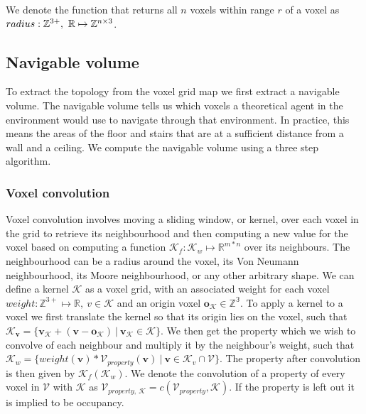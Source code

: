 \documentclass{article}
\begin{document}
We denote the function that returns all \(n\) voxels within range \(r\) of a voxel as \(radius: \mathbb{Z}^{3+},\ \mathbb{R} \mapsto \voxelset\).

\subsection{Navigable volume}
To extract the topology from the voxel grid map we first extract a navigable volume. The navigable volume tells us which voxels a theoretical agent in the environment would use to navigate through that environment. In practice, this means the areas of the floor and stairs that are at a sufficient distance from a wall and a ceiling. We compute the navigable volume using a three step algorithm.

\subsubsection{Voxel convolution}
Voxel convolution involves moving a sliding window, or kernel, over each voxel in the grid to retrieve its neighbourhood and then computing a new value for the voxel based on computing a function \(\mathcal{K}_f: \mathcal{K}_w \mapsto \mathbb{R}^{m*n}\) over its neighbours. The neighbourhood can be a radius around the voxel, its Von Neumann neighbourhood, its Moore neighbourhood, or any other arbitrary shape. We can define a kernel \(\mathcal{K}\) as a voxel grid, with an associated weight for each voxel \(weight: \mathbb{Z}^{3+} \mapsto \mathbb{R},\ v \in {\mathcal{K}}\) and an origin voxel \(\boldsymbol{o_{\mathcal{K}}} \in \mathbb{Z^{3}}\). To apply a kernel to a voxel we first translate the kernel so that its origin lies on the voxel, such that \(\mathcal{K}_{\boldsymbol{v}} = \{\boldsymbol{v_{\mathcal{K}}} + (\boldsymbol{v} - \boldsymbol{o_{\mathcal{K}}})\ |\ \boldsymbol{v_{\mathcal{K}}} \in \mathcal{K}\}\). We then get the property which we wish to convolve of each neighbour and multiply it by the neighbour's weight, such that \(\mathcal{K}_{w} = \{weight(\boldsymbol{v}) * \mathcal{V}_{property}(\boldsymbol{v})\ |\ \boldsymbol{v} \in \mathcal{K}_{v} \cap \mathcal{V}\}\). The property after convolution is then given by \(\mathcal{K}_f(\mathcal{K}_{w})\). We denote the convolution of a property of every voxel in \(\mathcal{V}\) with \(\mathcal{K}\) as \(\mathcal{V}_{property,\  \mathcal{K}} = c(\mathcal{V}_{property},\mathcal{K})\). If the property is left out it is implied to be occupancy.
\end{document}

